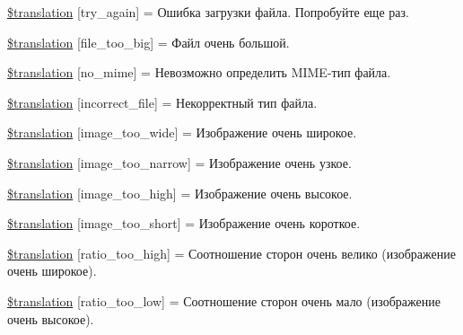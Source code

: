 \begin{DoxyCompactItemize}
\item 
\hyperlink{class_8upload_8ru___r_u_8php_a3afc377bd803683314f413a814243066}{\$translation} \mbox{[}\textquotesingle{}try\+\_\+again\textquotesingle{}\mbox{]} = \textquotesingle{}Ошибка загрузки файла. Попробуйте еще раз.\textquotesingle{}
\item 
\hyperlink{class_8upload_8ru___r_u_8php_a476278eb4a0c3df56af068e2d511a741}{\$translation} \mbox{[}\textquotesingle{}file\+\_\+too\+\_\+big\textquotesingle{}\mbox{]} = \textquotesingle{}Файл очень большой.\textquotesingle{}
\item 
\hyperlink{class_8upload_8ru___r_u_8php_a191a55df8e3bb7f3c51b70f3c1932e02}{\$translation} \mbox{[}\textquotesingle{}no\+\_\+mime\textquotesingle{}\mbox{]} = \textquotesingle{}Невозможно определить M\+I\+M\+E-\/тип файла.\textquotesingle{}
\item 
\hyperlink{class_8upload_8ru___r_u_8php_a4d32343e2699edd6fd435f9c832cb9c7}{\$translation} \mbox{[}\textquotesingle{}incorrect\+\_\+file\textquotesingle{}\mbox{]} = \textquotesingle{}Некорректный тип файла.\textquotesingle{}
\item 
\hyperlink{class_8upload_8ru___r_u_8php_a0dd3e4930ca1f59ae280f4b1006525cd}{\$translation} \mbox{[}\textquotesingle{}image\+\_\+too\+\_\+wide\textquotesingle{}\mbox{]} = \textquotesingle{}Изображение очень широкое.\textquotesingle{}
\item 
\hyperlink{class_8upload_8ru___r_u_8php_a5c9a4cd67fd21c32e0a3b434591a6037}{\$translation} \mbox{[}\textquotesingle{}image\+\_\+too\+\_\+narrow\textquotesingle{}\mbox{]} = \textquotesingle{}Изображение очень узкое.\textquotesingle{}
\item 
\hyperlink{class_8upload_8ru___r_u_8php_aa27bde361343f3b63c7cd441860024f8}{\$translation} \mbox{[}\textquotesingle{}image\+\_\+too\+\_\+high\textquotesingle{}\mbox{]} = \textquotesingle{}Изображение очень высокое.\textquotesingle{}
\item 
\hyperlink{class_8upload_8ru___r_u_8php_a86fcd4e1157b00032df451188d735527}{\$translation} \mbox{[}\textquotesingle{}image\+\_\+too\+\_\+short\textquotesingle{}\mbox{]} = \textquotesingle{}Изображение очень короткое.\textquotesingle{}
\item 
\hyperlink{class_8upload_8ru___r_u_8php_a23396f6ce7f31e5e5f1b57580621d982}{\$translation} \mbox{[}\textquotesingle{}ratio\+\_\+too\+\_\+high\textquotesingle{}\mbox{]} = \textquotesingle{}Соотношение сторон очень велико (изображение очень широкое).\textquotesingle{}
\item 
\hyperlink{class_8upload_8ru___r_u_8php_ac533b9a479f056b0b8623e4268f068c2}{\$translation} \mbox{[}\textquotesingle{}ratio\+\_\+too\+\_\+low\textquotesingle{}\mbox{]} = \textquotesingle{}Соотношение сторон очень мало (изображение очень высокое).\textquotesingle{}

\end{DoxyCompactItemize}

